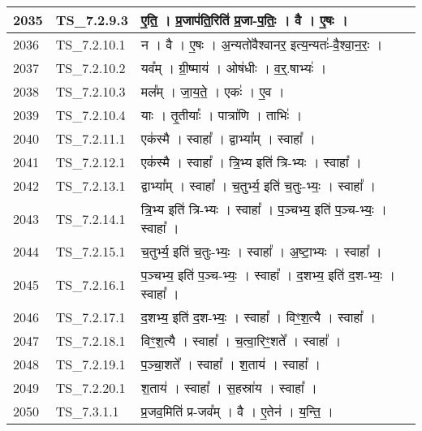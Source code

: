 \documentclass[17pt]{extarticle}
\begin{document}
\begin{longtable}{||p{0.4in}||p{0.9in}||p{4.0in}||p{0.9in}||}
        \hline
            2035 & TS\_7.2.9.3 & ए॒ति॒   ।   प्र॒जाप॑ति॒रिति॑ प्र॒जा{-}प॒तिः॒   ।   वै   ।   ए॒षः   ।    &      \\
        \hline
            2036 & TS\_7.2.10.1 & न   ।   वै   ।   ए॒षः   ।   अ॒न्यतो॑वैश्वानर॒ इत्य॒न्यतः॑{-}वै॒श्वा॒न॒रः॒   ।    &      \\
        \hline
            2037 & TS\_7.2.10.2 & यव᳚म्   ।   ग्री॒ष्माय॑   ।   ओष॑धीः   ।   व॒र्॒.षाभ्यः॑   ।    &      \\
        \hline
            2038 & TS\_7.2.10.3 & मल᳚म्   ।   जा॒य॒ते॒   ।   एकः॑   ।   ए॒व   ।    &      \\
        \hline
            2039 & TS\_7.2.10.4 & याः   ।   तृ॒तीयाः᳚   ।   पात्रा॑णि   ।   ताभिः॑   ।    &      \\
        \hline
            2040 & TS\_7.2.11.1 & एक॑स्मै   ।   स्वाहा᳚   ।   द्वाभ्या᳚म्   ।   स्वाहा᳚   ।    &      \\
        \hline
            2041 & TS\_7.2.12.1 & एक॑स्मै   ।   स्वाहा᳚   ।   त्रि॒भ्य इति॑ त्रि{-}भ्यः   ।   स्वाहा᳚   ।    &      \\
        \hline
            2042 & TS\_7.2.13.1 & द्वाभ्या᳚म्   ।   स्वाहा᳚   ।   च॒तुर्भ्य॒ इति॑ च॒तुः{-}भ्यः॒   ।   स्वाहा᳚   ।    &      \\
        \hline
            2043 & TS\_7.2.14.1 & त्रि॒भ्य इति॑ त्रि{-}भ्यः   ।   स्वाहा᳚   ।   प॒ञ्चभ्य॒ इति॑ प॒ञ्च{-}भ्यः॒   ।   स्वाहा᳚   ।    &      \\
        \hline
            2044 & TS\_7.2.15.1 & च॒तुर्भ्य॒ इति॑ च॒तुः{-}भ्यः॒   ।   स्वाहा᳚   ।   अ॒ष्टा॒भ्यः   ।   स्वाहा᳚   ।    &      \\
        \hline
            2045 & TS\_7.2.16.1 & प॒ञ्चभ्य॒ इति॑ प॒ञ्च{-}भ्यः॒   ।   स्वाहा᳚   ।   द॒शभ्य॒ इति॑ द॒श{-}भ्यः॒   ।   स्वाहा᳚   ।    &      \\
        \hline
            2046 & TS\_7.2.17.1 & द॒शभ्य॒ इति॑ द॒श{-}भ्यः॒   ।   स्वाहा᳚   ।   विꣳ॒॒श॒त्यै   ।   स्वाहा᳚   ।    &      \\
        \hline
            2047 & TS\_7.2.18.1 & विꣳ॒॒श॒त्यै   ।   स्वाहा᳚   ।   च॒त्वा॒रिꣳ॒॒शते᳚   ।   स्वाहा᳚   ।    &      \\
        \hline
            2048 & TS\_7.2.19.1 & प॒ञ्चा॒शते᳚   ।   स्वाहा᳚   ।   श॒ताय॑   ।   स्वाहा᳚   ।    &      \\
        \hline
            2049 & TS\_7.2.20.1 & श॒ताय॑   ।   स्वाहा᳚   ।   स॒हस्रा॑य   ।   स्वाहा᳚   ।    &      \\
        \hline
            2050 & TS\_7.3.1.1 & प्र॒जव॒मिति॑ प्र{-}जव᳚म्   ।   वै   ।   ए॒तेन॑   ।   य॒न्ति॒   ।    &      \\

\end{longtable}
\end{document}
